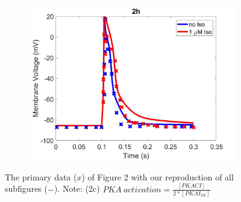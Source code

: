 \documentclass[fleqn,10pt]{physiome}
\begin{document}
\begin{figure}
\begin{subfigure}[b]{0.49\textwidth}
        \includegraphics[width=\textwidth]{figures/F2h.jpg}
    \end{subfigure}
    \caption{The primary data ($x$) of Figure 2 with our reproduction of all subfigures ($-$). Note: (2c) $PKA\ activation = \frac{[PKACI]}{2*[PKAI_{tot}]}$}
    \label{fig:2}
\end{figure}
\end{document}
